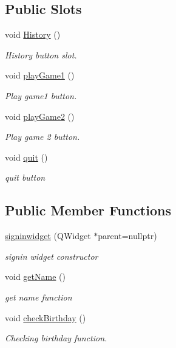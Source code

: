 \subsection*{Public Slots}
\begin{DoxyCompactItemize}
\item 
void \hyperlink{classsigninwidget_ad65d01b8dfc345ec25de223a989fd074}{History} ()
\begin{DoxyCompactList}\small\item\em History button slot. \end{DoxyCompactList}\item 
void \hyperlink{classsigninwidget_a885c28fa8a2f7bb105049645f6b28de9}{play\+Game1} ()
\begin{DoxyCompactList}\small\item\em Play game1 button. \end{DoxyCompactList}\item 
void \hyperlink{classsigninwidget_a5f450a4cfdb5151fd1e3254f094d0265}{play\+Game2} ()
\begin{DoxyCompactList}\small\item\em Play game 2 button. \end{DoxyCompactList}\item 
void \hyperlink{classsigninwidget_a873db27ec0eb7d4b758fac6d8f39519a}{quit} ()
\begin{DoxyCompactList}\small\item\em quit button \end{DoxyCompactList}\end{DoxyCompactItemize}
\subsection*{Public Member Functions}
\begin{DoxyCompactItemize}
\item 
\hyperlink{classsigninwidget_aee9526f175ba0bdd88438b7b0d26b99d}{signinwidget} (Q\+Widget $\ast$parent=nullptr)
\begin{DoxyCompactList}\small\item\em signin widget constructor \end{DoxyCompactList}\item 
void \hyperlink{classsigninwidget_a718e8f00822a5386e064765def03d4a7}{get\+Name} ()
\begin{DoxyCompactList}\small\item\em get name function \end{DoxyCompactList}\item 
void \hyperlink{classsigninwidget_a224d1d91ae499107379f886fbd9bec88}{check\+Birthday} ()
\begin{DoxyCompactList}\small\item\em Checking birthday function. \end{DoxyCompactList}\end{DoxyCompactItemize}
